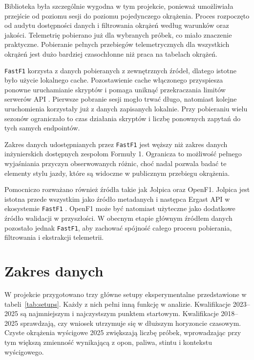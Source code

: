 \documentclass[printmode,pl]{mgr}
\begin{document}
Biblioteka była szczególnie wygodna w tym projekcie, ponieważ umożliwiała przejście od poziomu sesji do poziomu pojedynczego okrążenia. Proces rozpoczęto od audytu dostępności danych i filtrowania okrążeń według warunków oraz jakości. Telemetrię pobierano już dla wybranych próbek, co miało znaczenie praktyczne. Pobieranie pełnych przebiegów telemetrycznych dla wszystkich okrążeń jest dużo bardziej czasochłonne niż praca na tabelach okrążeń.

\texttt{FastF1} korzysta z danych pobieranych z zewnętrznych źródeł, dlatego istotne było użycie lokalnego cache. Pozostawienie cache włączonego przyspiesza ponowne uruchamianie skryptów i pomaga uniknąć przekraczania limitów serwerów API \cite{fastf1_docs}. Pierwsze pobranie sesji mogło trwać długo, natomiast kolejne uruchomienia korzystały już z danych zapisanych lokalnie. Przy pobieraniu wielu sezonów ograniczało to czas działania skryptów i liczbę ponownych zapytań do tych samych endpointów.

Zakres danych udostępnianych przez \texttt{FastF1} jest węższy niż zakres danych inżynierskich dostępnych zespołom Formuły 1. Ogranicza to możliwość pełnego wyjaśniania przyczyn obserwowanych różnic, choć nadal pozwala badać te elementy stylu jazdy, które są widoczne w publicznym przebiegu okrążenia.

Pomocniczo rozważano również źródła takie jak Jolpica oraz OpenF1. Jolpica jest istotna przede wszystkim jako źródło metadanych i następca Ergast API w ekosystemie \texttt{FastF1} \cite{fastf1_docs}. OpenF1 może być natomiast użyteczne jako dodatkowe źródło walidacji w przyszłości. W obecnym etapie głównym źródłem danych pozostało jednak \texttt{FastF1}, aby zachować spójność całego procesu pobierania, filtrowania i ekstrakcji telemetrii.

\section{Zakres danych}

W projekcie przygotowano trzy główne setupy eksperymentalne przedstawione w tabeli~\ref{tab:setups}. Każdy z nich pełni inną funkcję w analizie. Kwalifikacje 2023--2025 są najmniejszym i najczystszym punktem startowym. Kwalifikacje 2018--2025 sprawdzają, czy wniosek utrzymuje się w dłuższym horyzoncie czasowym. Czyste okrążenia wyścigowe 2025 zwiększają liczbę próbek, wprowadzając przy tym większą zmienność wynikającą z opon, paliwa, stintu i kontekstu wyścigowego.
\end{document}
